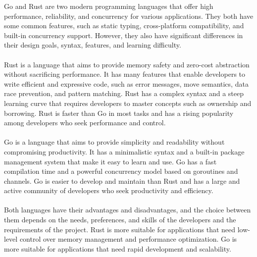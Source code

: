 \documentclass{dclass}
\begin{document}
Go and Rust are two modern programming languages that offer high performance, reliability, and concurrency for various applications. They both have some common features, such as static typing, cross-platform compatibility, and built-in concurrency support. However, they also have significant differences in their design goals, syntax, features, and learning difficulty.\\\\
Rust is a language that aims to provide memory safety and zero-cost abstraction without sacrificing performance. It has many features that enable developers to write efficient and expressive code, such as error messages, move semantics, data race prevention, and pattern matching. Rust has a complex syntax and a steep learning curve that requires developers to master concepts such as ownership and borrowing. Rust is faster than Go in most tasks and has a rising popularity among developers who seek performance and control.\\\\
Go is a language that aims to provide simplicity and readability without compromising productivity. It has a minimalistic syntax and a built-in package management system that make it easy to learn and use. Go has a fast compilation time and a powerful concurrency model based on goroutines and channels. Go is easier to develop and maintain than Rust and has a large and active community of developers who seek productivity and efficiency.\\\\
Both languages have their advantages and disadvantages, and the choice between them depends on the needs, preferences, and skills of the developers and the requirements of the project. Rust is more suitable for applications that need low-level control over memory management and performance optimization. Go is more suitable for applications that need rapid development and scalability.\\
\end{document}
